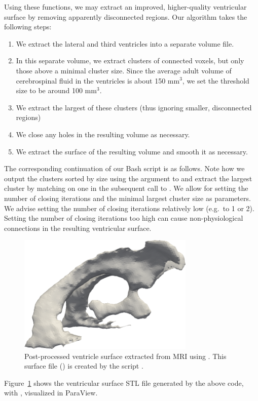 Using these functions, we may extract an improved, higher-quality
ventricular surface by removing apparently disconnected regions. Our
algorithm takes the following steps:
\begin{enumerate}
\item
  We extract the lateral and third ventricles into a separate volume
  file.
\item
  In this separate volume, we extract clusters of connected voxels,
  but only those above a minimal cluster size. Since the average adult
  volume of cerebrospinal fluid in the ventricles is about 150
  mm$^{3}$, we set the threshold size to be around 100 mm$^3$.
\item
  We extract the largest of these clusters (thus ignoring smaller,
  disconnected regions)
\item
  We close any holes in the resulting volume as necessary.
\item
  We extract the surface of the resulting volume and smooth it as
  necessary.
\end{enumerate}
The corresponding continuation of our Bash script is as follows. Note
how we output the clusters sorted by size using the argument
 to  and extract the largest
cluster by matching on one in the subsequent call to
. We allow for setting the number of closing
iterations  and the minimal largest cluster size
 as parameters. We advise setting the number of closing
iterations relatively low (e.g.~to 1 or 2). Setting the number of closing
iterations too high can cause non-physiological connections in the
resulting ventricular surface.


\begin{figure}%
  \centering
  \includegraphics[width=0.75\textwidth]{./graphics/chp4/ernie-ventricles-final-r.png}
  \caption{Post-processed ventricle %
    surface extracted from MRI using \freesurfer{}.  This surface file 
    () is created by the script 
    .}
  \label{fig:chp4:ernie-ventricles-final}
\end{figure}
\noindent Figure~\ref{fig:chp4:ernie-ventricles-final} shows the ventricular
surface STL file generated by the above code, with , 
visualized in ParaView. 

